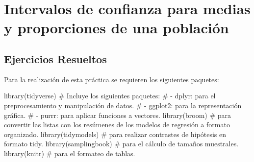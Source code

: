 \documentclass[
  a4paper,
]{scrreport}
\newenvironment{Shaded}{\begin{snugshade}}{\end{snugshade}}
\newcommand{\CommentTok}[1]{\textcolor[rgb]{0.37,0.37,0.37}{#1}}
\newcommand{\FunctionTok}[1]{\textcolor[rgb]{0.28,0.35,0.67}{#1}}
\newcommand{\NormalTok}[1]{\textcolor[rgb]{0.00,0.23,0.31}{#1}}
\theoremstyle{definition}
\theoremstyle{remark}
\begin{document}
\hypertarget{intervalos-de-confianza-para-medias-y-proporciones-de-una-poblaciuxf3n}{%
\chapter{Intervalos de confianza para medias y proporciones de una
población}\label{intervalos-de-confianza-para-medias-y-proporciones-de-una-poblaciuxf3n}}

\hypertarget{ejercicios-resueltos-5}{%
\section{Ejercicios Resueltos}\label{ejercicios-resueltos-5}}

Para la realización de esta práctica se requieren los siguientes
paquetes:

\begin{Shaded}
\begin{Highlighting}[]
\FunctionTok{library}\NormalTok{(tidyverse)}
\CommentTok{\# Incluye los siguientes paquetes:}
\CommentTok{\# {-} dplyr: para el preprocesamiento y manipulación de datos.}
\CommentTok{\# {-} ggplot2: para la representación gráfica.}
\CommentTok{\# {-} purrr: para aplicar funciones a vectores.}
\FunctionTok{library}\NormalTok{(broom) }\CommentTok{\# para convertir las listas con los resúmenes de los modelos de regresión a formato organizado.}
\FunctionTok{library}\NormalTok{(tidymodels) }\CommentTok{\# para realizar contrastes de hipótesis en formato tidy.}
\FunctionTok{library}\NormalTok{(samplingbook) }\CommentTok{\# para el cálculo de tamaños muestrales.}
\FunctionTok{library}\NormalTok{(knitr) }\CommentTok{\# para el formateo de tablas.}
\end{Highlighting}
\end{Shaded}
\end{document}
